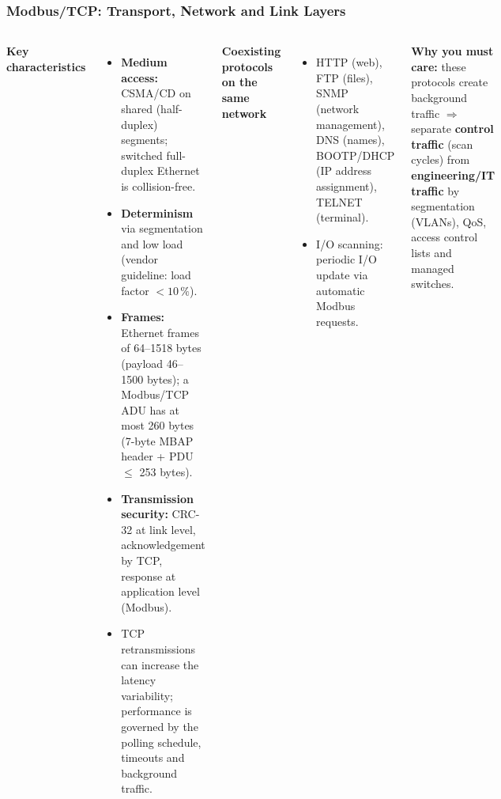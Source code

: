 \begin{frame}
	\frametitle{Modbus/TCP: Transport, Network and Link Layers}
	\begin{columns}[T,onlytextwidth]
		\footnotesize
		\textbf{Key characteristics}
		\begin{itemize}
			\item \textbf{Medium access:} CSMA/CD on shared (half-duplex) segments; switched full-duplex Ethernet is collision-free.
			\item \textbf{Determinism} via segmentation and low load (vendor guideline: load factor $< 10\,\%$).
			\item \textbf{Frames:} Ethernet frames of 64--1518 bytes (payload 46--1500 bytes); a Modbus/TCP ADU has at most 260 bytes (7-byte MBAP header + PDU $\leq$ 253 bytes).
			\item \textbf{Transmission security:} CRC-32 at link level, acknowledgement by TCP, response at application level (Modbus).
			\item TCP retransmissions can increase the latency variability; performance is governed by the polling schedule, timeouts and background traffic.
		\end{itemize}
		\footnotesize
		\textbf{Coexisting protocols on the same network}
		\begin{itemize}
			\item HTTP (web), FTP (files), SNMP (network management), DNS (names), BOOTP/DHCP (IP address assignment), TELNET (terminal).
			\item I/O scanning: periodic I/O update via automatic Modbus requests.
		\end{itemize}
		\textbf{Why you must care:} these protocols create background traffic $\Rightarrow$ separate \textbf{control traffic} (scan cycles) from \textbf{engineering/IT traffic} by segmentation (VLANs), QoS, access control lists and managed switches.
	\end{columns}
\end{frame}

